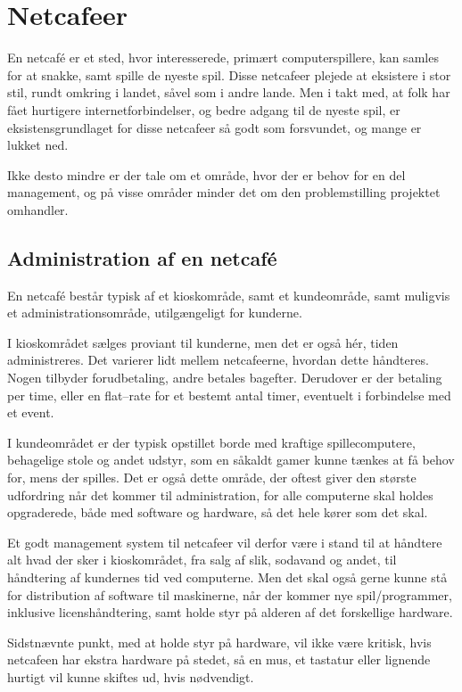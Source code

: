 \chapter{Netcafeer}\label{chap:netcafeer}

En netcafé er et sted, hvor interesserede, primært computerspillere, kan samles for at snakke, samt spille de
nyeste spil. Disse netcafeer plejede at eksistere i stor stil, rundt omkring i landet, såvel som i andre
lande. Men i takt med, at folk har fået hurtigere internetforbindelser, og bedre adgang til de nyeste spil, er
eksistensgrundlaget for disse netcafeer så godt som forsvundet, og mange er lukket ned.

Ikke desto mindre er der tale om et område, hvor der er behov for en del management, og på visse områder
minder det om den problemstilling projektet omhandler.


\section{Administration af en netcafé}\label{sec:administration-af-en-netcafe}

En netcafé består typisk af et kioskområde, samt et kundeområde, samt muligvis et administrationsområde,
utilgængeligt for kunderne.

I kioskområdet sælges proviant til kunderne, men det er også hér, tiden administreres. Det varierer lidt
mellem netcafeerne, hvordan dette håndteres. Nogen tilbyder forudbetaling, andre betales bagefter. Derudover
er der betaling per time, eller en flat--rate for et bestemt antal timer, eventuelt i forbindelse med et
event.

I kundeområdet er der typisk opstillet borde med kraftige spillecomputere, behagelige stole og andet udstyr,
som en såkaldt gamer kunne tænkes at få behov for, mens der spilles. Det er også dette område, der oftest
giver den største udfordring når det kommer til administration, for alle computerne skal holdes opgraderede,
både med software og hardware, så det hele kører som det skal.

Et godt management system til netcafeer vil derfor være i stand til at håndtere alt hvad der sker i
kioskområdet, fra salg af slik, sodavand og andet, til håndtering af kundernes tid ved computerne. Men det
skal også gerne kunne stå for distribution af software til maskinerne, når der kommer nye spil/programmer,
inklusive licenshåndtering, samt holde styr på alderen af det forskellige hardware.

Sidstnævnte punkt, med at holde styr på hardware, vil ikke være kritisk, hvis netcafeen har ekstra hardware på
stedet, så en mus, et tastatur eller lignende hurtigt vil kunne skiftes ud, hvis nødvendigt.


